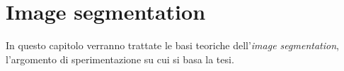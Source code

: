 \chapter{Image segmentation}
In questo capitolo verranno trattate le basi teoriche 
dell'\textit{image segmentation}, l'argomento di sperimentazione su cui si 
basa la tesi.
